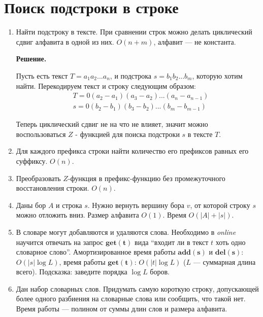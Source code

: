 \section*{Поиск подстроки в строке}
\begin{enumerate}
	\item Найти подстроку в тексте. При сравнении строк можно делать циклический сдвиг алфавита в одной из них. 
	$O(n + m)$, алфавит — не константа.
	
	\textbf{Решение.}
	
	Пусть есть текст $T = a_1a_2...a_n$, и подстрока $s = b_1b_2...b_m$, которую хотим найти. Перекодируем текст и 
	строку следующим образом:
	\begin{align*}
		& T = 0(a_2 - a_1)(a_3 - a_2)...(a_n - a_{n - 1}) \\
		& s = 0(b_2 - b_1)(b_3 - b_2)...(b_m - b_{m - 1})
	\end{align*}
	
	Теперь циклический сдвиг не на что не влияет, значит можно воспользоваться $Z$ - функцией для поиска подстроки 
	$s$ в тексте $T$.
	
	\item Для каждого префикса строки найти количество его префиксов равных его суффиксу. $O(n)$.
	
	\item Преобразовать $Z$-функция в префикс-функцию без промежуточного восстановления строки. $O(n)$.
	
	\item Даны бор $A$ и строка $s$. Нужно вернуть вершину бора $v$, от которой строку $s$ можно отложить вниз. 
	Размер алфавита $O(1)$. Время $O(|A| + |s|)$.
	
	\item В словаре могут добавляются и удаляются слова. Необходимо в \textit{online} научится отвечать на запрос 
	$\mathbf{get(t)}$ вида “входит ли в текст $t$ хоть одно словарное слово”. Амортизированное время работы 
	$\mathbf{add(s)}$ и $\mathbf{del(s)}$: $O(|s| \log L)$, время работы $\mathbf{get(t)}$: $O(|t| \log L)$ ($L$ — 
	суммарная длина всего). Подсказка: заведите порядка $\log L$ боров.
	
	\item Дан набор словарных слов. Придумать самую короткую строку, допускающей более одного разбиения на 
	словарные слова или сообщить, что такой нет. Время работы — полином от суммы длин слов и размера алфавита.
\end{enumerate}

